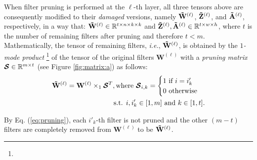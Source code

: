 When filter pruning is performed at the $\ell$-th layer, all three tensors above are consequently modified to their \textit{damaged} versions, namely $\mathbf{\Tilde{W}}^{(\ell)}$, $\mathbf{\Tilde{Z}}^{(\ell)}$, and $\mathbf{\Tilde{A}}^{(\ell)}$, respectively, in a way that: $\mathbf{\Tilde{W}}^{(\ell)} \in \mathbb{R}^{t \times n \times k \times k}$ and $\mathbf{\Tilde{Z}}^{(\ell)},\mathbf{\Tilde{A}}^{(\ell)} \in \mathbb{R}^{t \times w \times h}$, where $t$ is the number of remaining filters after pruning and therefore $t < m$. Mathematically, the tensor of remaining filters, \textit{i.e.}, $\mathbf{\Tilde{W}}^{(\ell)}$, is obtained by the \textit{$1$-mode product} \cite{DBLP:journals/siamrev/KoldaB09}\footnote{} of the tensor of the original filters $\mathbf{W}^{(\ell)}$ with a \textit{pruning matrix} $\boldsymbol{\S} \in \mathbb{R}^{m \times t}$ (see Figure \ref{fig:matrix:a})
as follows:
\begin{eqnarray}\begin{split}\label{eq:pruning}
\mathbf{\Tilde{W}}^{(\ell)} = {\mathbf{W}}^{(\ell)} \times_{1} {\boldsymbol{\S}}^{T},\text{where }\boldsymbol{\S}_{i,k} = 
  \begin{cases} 
   1~ \text{if } i = i'_k \\
   0~ \text{otherwise}
  \end{cases} \\
  \text{s.t. } i, i'_k \in [1, m] 
  \text{ and } k \in [1, t].
  \end{split}
\end{eqnarray}
  
By Eq. (\ref{eq:pruning}), each $i'_k$-th filter is not pruned and the other $(m-t)$ filters are completely removed from $\mathbf{W}^{(\ell)}$ to be $\mathbf{\Tilde{W}}^{(\ell)}$.

